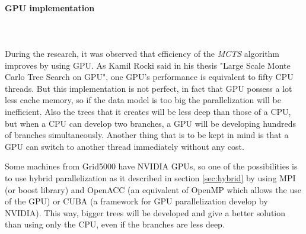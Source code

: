 \paragraph{GPU implementation}\mbox{}\\\mbox{}\\
During the research, it was observed that efficiency of the \emph{MCTS} algorithm improves by using GPU. As Kamil Rocki said in his thesis "Large Scale Monte Carlo Tree Search on GPU"\cite{GPU}, one GPU's performance is equivalent to fifty CPU threads. But this implementation is not perfect, in fact that GPU possess a lot less cache memory, so if the data model is too big the parallelization will be inefficient. Also the trees that it creates will be less deep than those of a CPU, but when a CPU can develop two branches, a GPU will be developing hundreds of branches simultaneously. Another thing that is to be kept in mind is that a GPU can switch to another thread immediately without any cost. 

Some machines from Grid5000 have NVIDIA GPUs, so one of the possibilities is to use hybrid parallelization as it described in section \ref{sec:hybrid} by using MPI (or boost library) and OpenACC (an equivalent of OpenMP which allows the use of the GPU) or CUBA (a framework for GPU parallelization develop by NVIDIA). This way, bigger trees will be developed and give a better solution than using only the CPU, even if the branches are less deep.